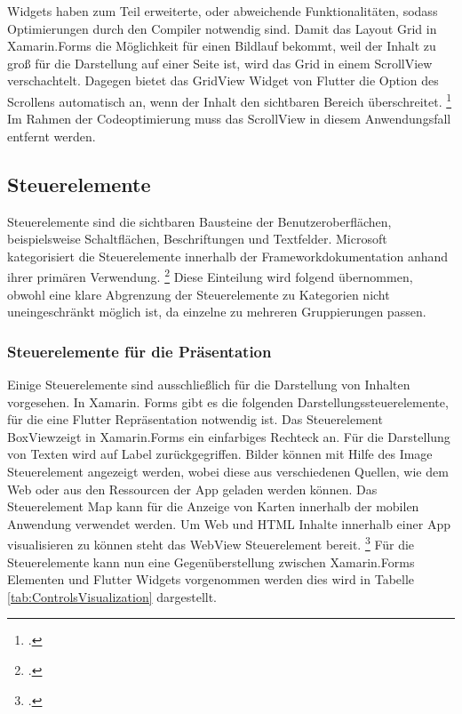 Widgets haben zum Teil erweiterte,  oder abweichende Funktionalitäten, sodass Optimierungen durch den Compiler notwendig sind.  Damit das Layout \glq Grid\grq{} in Xamarin.Forms die Möglichkeit für einen Bildlauf bekommt, weil der Inhalt zu groß für die Darstellung auf einer Seite ist, wird das \glq Grid\grq{} in einem \glq ScrollView\grq{} verschachtelt. Dagegen bietet das \glq GridView\grq{} Widget von Flutter die Option des Scrollens automatisch an, wenn der Inhalt den sichtbaren Bereich überschreitet. \footcite[Vgl.][Abgerufen am \today]{GoogleFlutterGridView2020} Im Rahmen der Codeoptimierung muss das \glq ScrollView\grq{} in diesem Anwendungsfall entfernt werden.

\subsection{Steuerelemente}

Steuerelemente sind die sichtbaren Bausteine der Benutzeroberflächen,  beispielsweise Schaltflächen, Beschriftungen und Textfelder.  
Microsoft kategorisiert die Steuerelemente innerhalb der Frameworkdokumentation anhand ihrer primären Verwendung. \footcite[Vgl.][Abgerufen am \today]{MicrosoftXamViews2020} Diese Einteilung wird folgend übernommen,  obwohl eine klare Abgrenzung der  Steuerelemente zu Kategorien nicht uneingeschränkt möglich ist,  da einzelne zu mehreren Gruppierungen passen.


\subsubsection{Steuerelemente für die Präsentation}
Einige Steuerelemente sind ausschließlich für die Darstellung von Inhalten vorgesehen.  In Xamarin. Forms gibt es die folgenden  Darstellungssteuerelemente, für die eine Flutter Repräsentation notwendig ist.  Das Steuerelement \glq BoxView\grq{ }zeigt in Xamarin.Forms ein einfarbiges Rechteck an.  Für die Darstellung von Texten wird auf \glq Label\grq{} zurückgegriffen.  Bilder können mit Hilfe des \glq Image\grq{}  Steuerelement angezeigt werden,  wobei diese aus verschiedenen Quellen, wie dem Web oder aus den Ressourcen der App geladen werden können.  Das Steuerelement \glq Map\grq{}  kann für die Anzeige von Karten innerhalb der mobilen Anwendung verwendet werden.  Um Web und HTML Inhalte innerhalb einer App visualisieren zu können steht das \glq WebView\grq{}  Steuerelement bereit.  \footcite[Vgl.][Abgerufen am \today]{MicrosoftXamLayouts2018} Für die Steuerelemente kann nun eine Gegenüberstellung zwischen Xamarin.Forms Elementen und Flutter Widgets vorgenommen werden dies wird in Tabelle \ref{tab:ControlsVisualization} dargestellt.

